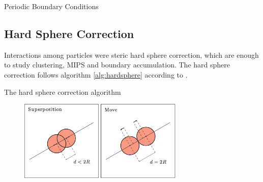 \documentclass[../../master_thesis_np.tex]{subfiles}
\begin{document}
	\begin{algorithm}[htp]
		\caption{Periodic Boundary Conditions} \label{alg:pbc}	
		\begin{algorithmic}[1]
			\EndIf
			\EndIf
			\EndFor
		\end{algorithmic}
	\end{algorithm}
	
	\subsection{Hard Sphere Correction}
	Interactions among particles were steric hard sphere correction, which are enough to study clustering, MIPS and boundary accumulation. The hard sphere correction follows algorithm \ref{alg:hardsphere} according to \cite{callegari_numerical_2019}.
	

	\begin{algorithm}[htp]
		\caption{The hard sphere correction algorithm} \label{alg:hardsphere}	
		\begin{algorithmic}[1]
			 

			\EndIf
			\EndFor
		\end{algorithmic}
		\end{algorithm}

		\begin{figure}[htp]
			\centering
			\includegraphics[width = 0.7\textwidth]{callegari_volpe_2019_hardsphere.png}
			\label{fig:hardsphere}
			\caption{ \cite{callegari_numerical_2019}}
		\end{figure}
\end{document}
